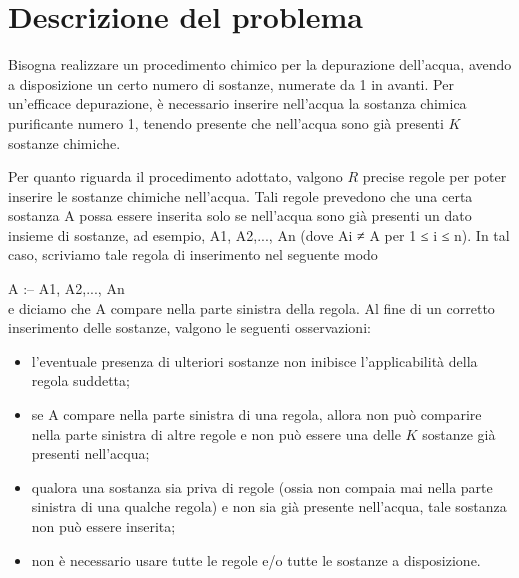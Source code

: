 \documentclass[a4paper,11pt]{article}
\begin{document}
\vspace{0.5cm}



\vspace{0.5cm}

\section*{Descrizione del problema}
   
Bisogna realizzare un procedimento chimico per la depurazione
dell'acqua, avendo a disposizione un certo numero di sostanze,
numerate da 1 in avanti. Per un'efficace depurazione, è
necessario inserire nell'acqua la sostanza chimica purificante
numero 1, tenendo presente che nell'acqua sono già
presenti $K$ sostanze chimiche.

Per quanto riguarda il procedimento adottato, valgono $R$
precise regole per poter inserire le sostanze chimiche
nell'acqua. Tali regole prevedono che una certa sostanza A possa
essere inserita solo se nell'acqua sono già presenti un dato insieme
di sostanze, ad esempio, A1, A2,..., An (dove Ai ≠ A per 1 ≤ i
≤ n).  In tal caso, scriviamo tale regola di inserimento nel
seguente modo

A :-- A1, A2,..., An\\
e diciamo che A compare nella parte sinistra della regola. Al fine di
un corretto inserimento delle sostanze, valgono le seguenti
osservazioni:


\begin{itemize}
  
    \item l'eventuale presenza di ulteriori sostanze non inibisce
l'applicabilità della regola suddetta;
    \item se A compare nella parte sinistra di una regola, allora non
  può comparire nella parte sinistra di altre regole e non
  può essere una delle $K$ sostanze già
  presenti nell'acqua;
    \item qualora una sostanza sia priva di regole (ossia non compaia mai nella
  parte sinistra di una qualche regola) e non sia già presente
  nell’acqua, tale sostanza non può essere inserita;
    \item non è necessario usare tutte le regole e/o tutte le
  sostanze a disposizione.
\end{itemize}
\end{document}
